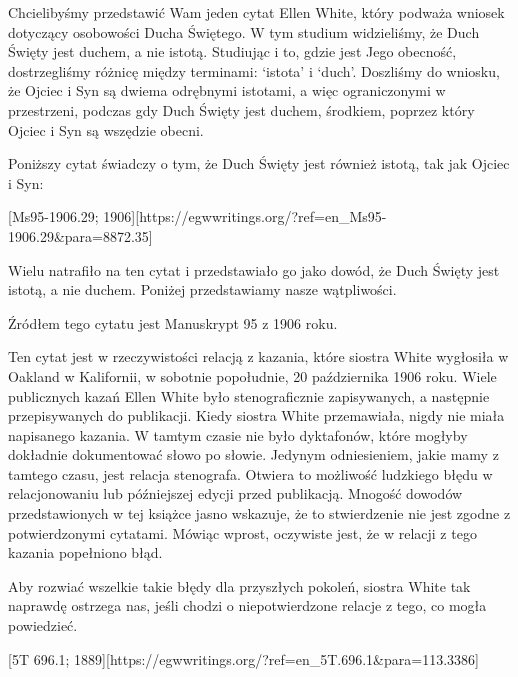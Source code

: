 \label{appendix:unauthenticated-reports}
Chcielibyśmy przedstawić Wam jeden cytat Ellen White, który podważa wniosek dotyczący osobowości Ducha Świętego. W tym studium widzieliśmy, że Duch Święty jest duchem, a nie istotą. Studiując  i to, gdzie jest Jego obecność, dostrzegliśmy różnicę między terminami: ‘istota’ i ‘duch’. Doszliśmy do wniosku, że Ojciec i Syn są dwiema odrębnymi istotami, a więc ograniczonymi w przestrzeni, podczas gdy Duch Święty jest duchem, środkiem, poprzez który Ojciec i Syn są wszędzie obecni.

Poniższy cytat świadczy o tym, że Duch Święty jest również istotą, tak jak Ojciec i Syn:

[Ms95-1906.29; 1906][https://egwwritings.org/?ref=en\_Ms95-1906.29&para=8872.35]

Wielu natrafiło na ten cytat i przedstawiało go jako dowód, że Duch Święty jest istotą, a nie duchem. Poniżej przedstawiamy nasze wątpliwości.

Źródłem tego cytatu jest Manuskrypt 95 z 1906 roku.

Ten cytat jest w rzeczywistości relacją z kazania, które siostra White wygłosiła w Oakland w Kalifornii, w sobotnie popołudnie, 20 października 1906 roku. Wiele publicznych kazań Ellen White było stenograficznie zapisywanych, a następnie przepisywanych do publikacji. Kiedy siostra White przemawiała, nigdy nie miała napisanego kazania. W tamtym czasie nie było dyktafonów, które mogłyby dokładnie dokumentować słowo po słowie. Jedynym odniesieniem, jakie mamy z tamtego czasu, jest relacja stenografa. Otwiera to możliwość ludzkiego błędu w relacjonowaniu lub późniejszej edycji przed publikacją. Mnogość dowodów przedstawionych w tej książce jasno wskazuje, że to stwierdzenie nie jest zgodne z potwierdzonymi cytatami. Mówiąc wprost, oczywiste jest, że w relacji z tego kazania popełniono błąd.

Aby rozwiać wszelkie takie błędy dla przyszłych pokoleń, siostra White tak naprawdę ostrzega nas, jeśli chodzi o niepotwierdzone relacje z tego, co mogła powiedzieć.

[5T 696.1; 1889][https://egwwritings.org/?ref=en\_5T.696.1&para=113.3386]

